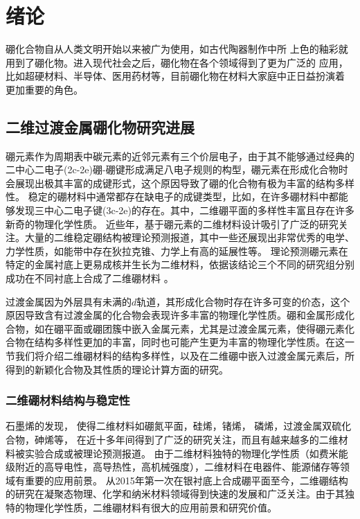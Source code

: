 \chapter{绪论}\label{chapter_introduction}
硼化合物自从人类文明开始以来被广为使用，如古代陶器制作中所
上色的釉彩就用到了硼化物。进入现代社会之后，硼化物在各个领域得到了更为广泛的
应用，比如超硬材料、半导体、医用药材等，目前硼化物在材料大家庭中正日益扮演着
更加重要的角色\cite{albert2009boron}。

\section{二维过渡金属硼化物研究进展}

硼元素作为周期表中碳元素的近邻元素有三个价层电子，由于其不能够通过经典的二中心二电子(2c-2e)硼-硼键形成满足八电子规则的构型，硼元素在形成化合物时会展现出极其丰富的成键形式，这个原因导致了硼的化合物有极为丰富的结构多样性。
稳定的硼材料中通常都存在缺电子的成键类型，比如，在许多硼材料中都能够发现三中心二电子键(3c-2e)的存在。其中，二维硼平面的多样性丰富且存在许多新奇的物理化学性质。
近些年，基于硼元素的二维材料设计吸引了广泛的研究关注。大量的二维稳定硼结构被理论预测报道，其中一些还展现出非常优秀的电学、力学性质，如能带中存在狄拉克锥、力学上有高的延展性等。
理论预测硼元素在特定的金属衬底上更易成核并生长为二维材料\cite{liu2013probing,liu2013boron,zhang2015two}，依据该结论三个不同的研究组分别成功在不同衬底上合成了二维硼材料\cite{mannix2015synthesis,zhong2017metastable,zhong2017synthesis,li2018experimental,feng2016experimental} 。

过渡金属因为外层具有未满的$d$轨道，其形成化合物时存在许多可变的价态，这个原因导致含有过渡金属的化合物会表现许多丰富的物理化学性质。硼和金属形成化合物，如在硼平面或硼团簇中嵌入金属元素，尤其是过渡金属元素，使得硼元素化合物在结构多样性更加的丰富，同时也可能产生更为丰富的物理化学性质。在这一节我们将介绍二维硼材料的结构多样性，以及在二维硼中嵌入过渡金属元素后，所得到的新颖化合物及其性质的理论计算方面的研究。

\subsection{二维硼材料结构与稳定性}
石墨烯\cite{novoselov2005two, zhang2005experimental, ferrari2006raman,yan2012first, lu2009tuning}的发现，
使得二维材料如硼氮平面\cite{watanabe2004direct}，硅烯\cite{liu2014comparison, molle2018silicene, li2018stable}，锗烯\cite{liu2015multiple}，
磷烯\cite{hu2018strong}，过渡金属双硫化合物\cite{cai2014constructing, wang2012electronics, pei2015exciton}，砷烯\cite{zhang2015atomically}等，
在近十多年间得到了广泛的研究关注，而且有越来越多的二维材料被实验合成或被理论预测报道。
由于二维材料独特的物理化学性质（如费米能级附近的高导电性，高导热性，高机械强度），二维材料在电器件、能源储存等领域有重要的应用前景。
从2015年第一次在银衬底上合成硼平面至今，二维硼结构的研究在凝聚态物理、化学和纳米材料领域得到快速的发展和广泛关注。由于其独特的物理化学性质，二维硼材料有很大的应用前景和研究价值。

